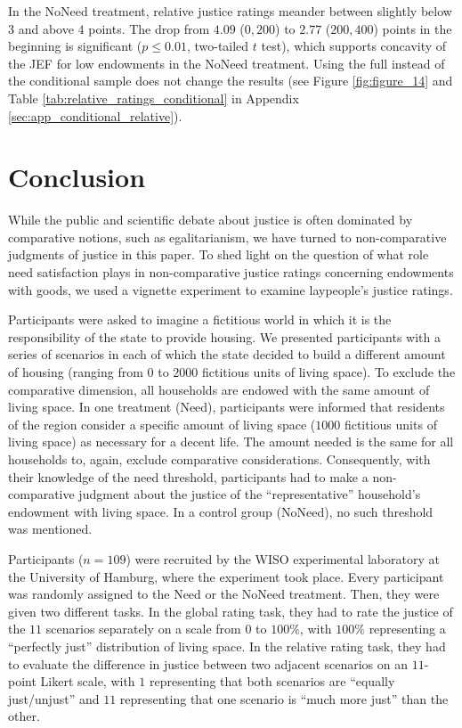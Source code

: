 \documentclass[12pt]{scrartcl}
\begin{document}
In the NoNeed treatment, relative justice ratings meander between slightly below $3$ and above $4$ points.
The drop from $4.09$ ($0,200$) to $2.77$ ($200,400$) points in the beginning is significant ($p\le 0.01$, two-tailed $t$ test), which supports concavity of the JEF for low endowments in the NoNeed treatment.
Using the full instead of the conditional sample does not change the results (see Figure \ref{fig:figure_14} and Table \ref{tab:relative_ratings_conditional} in Appendix \ref{sec:app_conditional_relative}).


\section{Conclusion}\label{sec:conclusion}
While the public and scientific debate about justice is often dominated by comparative notions, such as egalitarianism, we have turned to non-comparative judgments of justice in this paper.
To shed light on the question of what role need satisfaction plays in non-comparative justice ratings concerning endowments with goods, we used a vignette experiment to examine laypeople's justice ratings.

Participants were asked to imagine a fictitious world in which it is the responsibility of the state to provide housing.
We presented participants with a series of scenarios in each of which the state decided to build a different amount of housing (ranging from $0$ to $2000$ fictitious units of living space).
To exclude the comparative dimension, all households are endowed with the same amount of living space.
In one treatment (Need), participants were informed that residents of the region consider a specific amount of living space ($1000$ fictitious units of living space) as necessary for a decent life.
The amount needed is the same for all households to, again, exclude comparative considerations.
Consequently, with their knowledge of the need threshold, participants had to make a non-comparative judgment about the justice of the ``representative'' household's endowment with living space.
In a control group (NoNeed), no such threshold was mentioned.

Participants ($n=109$) were recruited by the WISO experimental laboratory at the University of Hamburg, where the experiment took place.
Every participant was randomly assigned to the Need or the NoNeed treatment.
Then, they were given two different tasks.
In the global rating task, they had to rate the justice of the $11$ scenarios separately on a scale from $0$ to $100\%$, with $100\%$ representing a ``perfectly just'' distribution of living space.
In the relative rating task, they had to evaluate the difference in justice between two adjacent scenarios on an $11$-point Likert scale, with $1$ representing that both scenarios are ``equally just/unjust'' and $11$ representing that one scenario is ``much more just'' than the other.
\end{document}
